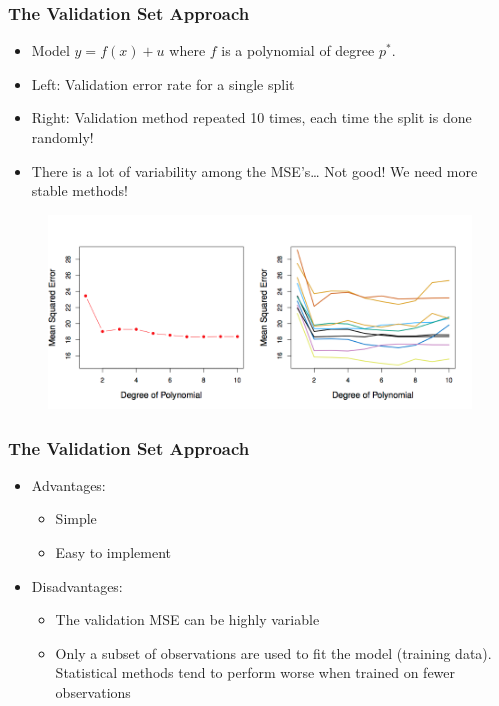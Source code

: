 \documentclass[
  shownotes,
  xcolor={svgnames},
  hyperref={colorlinks,citecolor=DarkBlue,linkcolor=DarkRed,urlcolor=DarkBlue}
  ]{beamer}
\begin{document}
\begin{frame}[fragile]
\frametitle{The Validation Set Approach}
\begin{itemize}
\item Model $y=f(x) +u$ where $f$ is a polynomial of degree $p^*$. 
\scriptsize
\item Left: Validation error rate for a single split 
\item Right: Validation method repeated 10 times, each time the split is done randomly! 
\item  There is a lot of variability among the MSE’s… Not good! We need more stable methods!
\end{itemize}


 \begin{figure}[H] \centering
            \captionsetup{justification=centering}
              \includegraphics[scale=0.7]{figures/fig52.png}
       \end{figure}
\end{frame}
\begin{frame}[fragile]
\frametitle{The Validation Set Approach}

\begin{itemize}
  \item Advantages:
  \medskip
    \begin{itemize}
      \item Simple
      \medskip
      \item Easy to implement
      \medskip
    \end{itemize}
  \item Disadvantages:
  \medskip
    \begin{itemize}
      \item The validation MSE can be highly variable
      \medskip
      \item  Only a subset of observations are used to fit the model (training data). Statistical methods tend to perform worse when trained on fewer observations
\end{itemize}
\end{itemize}

\end{frame}
\end{document}
